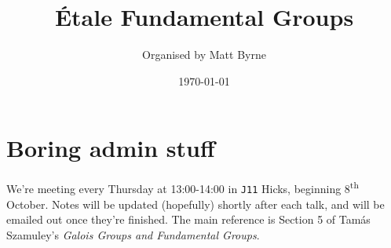 \documentclass{article}
\title{\vspace{-1.5cm}\'Etale Fundamental Groups}
\author{Organised by Matt Byrne}
\date{\today}
\begin{document}
	\maketitle

	\tableofcontents

	\section*{Boring admin stuff}
	We're meeting every Thursday at 13:00-14:00 in \texttt{J11} Hicks, beginning 8\textsuperscript{th} October. Notes will be updated (hopefully) shortly after each talk, and will be emailed out once they're finished. The main reference is Section 5 of Tam\'as Szamuley's \emph{Galois Groups and Fundamental Groups}.

\end{document}
